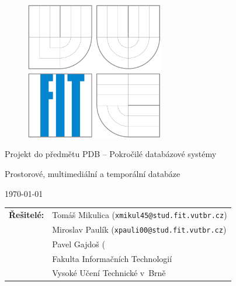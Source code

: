 \begin{titlepage}

\vspace*{1cm}

\begin{figure}
  \centering
  \includegraphics[height=6cm]{images/fit.pdf}
\end{figure}

\vspace*{5mm}

\begin{center}
\begin{Large}
Projekt do předmětu PDB -- Pokročilé databázové systémy
\end{Large}
\end{center}

\vspace*{5mm}

\begin{center}
\begin{Huge}
Prostorové, multimediální a temporální databáze\\
\end{Huge}
\end{center}

\vspace*{1cm}

\begin{center}
\begin{Large}
\today
\end{Large}
\end{center}

\vfill

\begin{flushleft}
\begin{large}
\begin{tabular}{ll}

\bf Řešitelé:\hspace{3mm} & Tomáš Mikulica (\verb_xmikul45@stud.fit.vutbr.cz_) \\
& Miroslav Paulík (\verb_xpauli00@stud.fit.vutbr.cz_) \\
& Pavel Gajdoš (\verb xgajdo13@stud.fit.vutbr.cz) \\
& Fakulta Informačních Technologií \\
& Vysoké Učení Technické v~Brně

\end{tabular}
\end{large}
\end{flushleft}

\end{titlepage}


